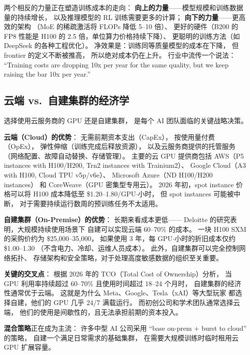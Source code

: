 \begin{corebox}[2026 年的成本趋势]
两个相反的力量正在塑造训练成本的走向：
\textbf{向上的力量}——模型规模和训练数据量的持续增长，
以及推理模型的 RL 训练需要更多的计算；
\textbf{向下的力量}——更高效的架构
（MoE 的稀疏激活将 FLOPs 降低 5--10 倍）、
更好的硬件（B200 的 FP8 性能是 H100 的 2.5 倍，单位算力价格持续下降）、
更聪明的训练方法（如 DeepSeek 的各种工程优化）。
净效果是：训练同等质量模型的成本在下降，
但 frontier 的定义不断被推高，
所以绝对成本仍在上升。
行业中流传一个说法：
“Training costs are dropping 10x per year for the same quality,
but we keep raising the bar 10x per year.”
\end{corebox}

\subsection{云端 vs.\ 自建集群的经济学}
\label{sec:cloud-vs-onprem}

选择使用云服务商的 GPU 还是自建集群，
是每个 AI 团队面临的关键战略决策。

\textbf{云端（Cloud）的优势}：
无需前期资本支出（CapEx），
按使用量付费（OpEx），
弹性伸缩（训练完成后释放资源），
以及云服务商提供的托管服务
（网络配置、故障自动替换、存储管理）。
主要的云 GPU 提供商包括
AWS（P5 instances with H100/H200, Trn2 instances with Trainium2）、
Google Cloud（A3 with H100, Cloud TPU v5p/v6e）、
Microsoft Azure（ND H100/H200 instances）
和 CoreWeave（GPU 密集型专用云）。
2026 年初，spot instance 价格可以将 H100 成本降低至
\$1.20--1.80/GPU$\cdot$小时，
但 spot instances 可能被中断，
对于需要持续运行数周的预训练任务不太适用。

\textbf{自建集群（On-Premise）的优势}：
长期来看成本更低——
Deloitte 的研究表明，大规模持续使用场景下
自建可以实现云端 60--70\% 的成本。
一块 H100 SXM 的采购价约为 \$25,000--35,000，
如果使用 3 年，每 GPU$\cdot$小时的折旧成本仅约 \$1.00--1.30
（不含电力、冷却、运维人员成本）。
此外，自建集群可以完全控制网络拓扑、
存储架构和安全策略，对于处理高度敏感数据的组织至关重要。

\textbf{关键的交叉点}：
根据 2026 年的 TCO（Total Cost of Ownership）分析，
当 GPU 利用率持续超过 60--70\% 且使用时间超过 18--24 个月时，
自建集群的经济性通常优于云端。
这就是为什么 Meta、Google、Tesla（xAI）等大型玩家
都选择自建，他们的 GPU 几乎 24/7 满载运行。
而初创公司和学术团队通常选择云端，
他们的使用是间歇性的，且无法承担前期的资本投入。

\textbf{混合策略}正在成为主流：
许多中型 AI 公司采用 “base on-prem + burst to cloud” 的策略，
自建一个满足日常需求的基础集群，
在需要大规模训练时临时租用云 GPU 扩展容量。

